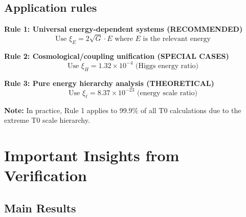 	\subsection{Application rules}
	
	\begin{tcolorbox}[colback=blue!5!white,colframe=blue!75!black,title=Application Rules for $\xi$ Parameters (Pure Energy)]
		\textbf{Rule 1: Universal energy-dependent systems (RECOMMENDED)}
		\begin{equation}
			\text{Use } \xi_E = 2\sqrt{G} \cdot E \text{ where } E \text{ is the relevant energy}
		\end{equation}
		
		\textbf{Rule 2: Cosmological/coupling unification (SPECIAL CASES)}
		\begin{equation}
			\text{Use } \xi_H = 1.32 \times 10^{-4} \text{ (Higgs energy ratio)}
		\end{equation}
		
		\textbf{Rule 3: Pure energy hierarchy analysis (THEORETICAL)}
		\begin{equation}
			\text{Use } \xi_\ell = 8.37 \times 10^{-23} \text{ (energy scale ratio)}
		\end{equation}
		
		\textbf{Note:} In practice, Rule 1 applies to 99.9\% of all T0 calculations due to the extreme T0 scale hierarchy.
	\end{tcolorbox}
	
	\section{Important Insights from Verification}
	
	\subsection{Main Results}
	

